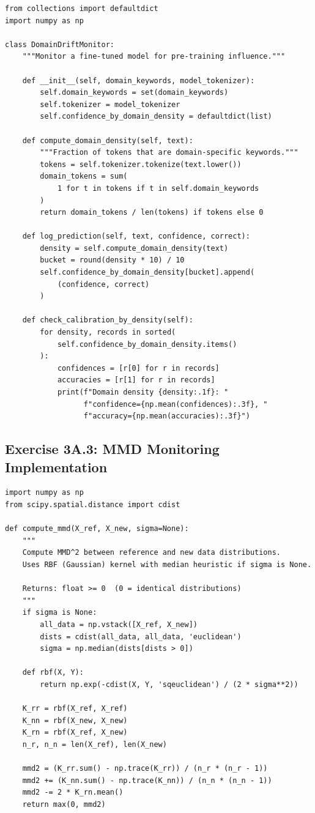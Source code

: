 \begin{lstlisting}[style=python, caption={Domain density monitoring for fine-tuned models}]
from collections import defaultdict
import numpy as np

class DomainDriftMonitor:
    """Monitor a fine-tuned model for pre-training influence."""

    def __init__(self, domain_keywords, model_tokenizer):
        self.domain_keywords = set(domain_keywords)
        self.tokenizer = model_tokenizer
        self.confidence_by_domain_density = defaultdict(list)

    def compute_domain_density(self, text):
        """Fraction of tokens that are domain-specific keywords."""
        tokens = self.tokenizer.tokenize(text.lower())
        domain_tokens = sum(
            1 for t in tokens if t in self.domain_keywords
        )
        return domain_tokens / len(tokens) if tokens else 0

    def log_prediction(self, text, confidence, correct):
        density = self.compute_domain_density(text)
        bucket = round(density * 10) / 10
        self.confidence_by_domain_density[bucket].append(
            (confidence, correct)
        )

    def check_calibration_by_density(self):
        for density, records in sorted(
            self.confidence_by_domain_density.items()
        ):
            confidences = [r[0] for r in records]
            accuracies = [r[1] for r in records]
            print(f"Domain density {density:.1f}: "
                  f"confidence={np.mean(confidences):.3f}, "
                  f"accuracy={np.mean(accuracies):.3f}")
\end{lstlisting}

\subsection{Exercise 3A.3: MMD Monitoring Implementation}

\begin{lstlisting}[style=python, caption={Maximum Mean Discrepancy drift monitor}]
import numpy as np
from scipy.spatial.distance import cdist

def compute_mmd(X_ref, X_new, sigma=None):
    """
    Compute MMD^2 between reference and new data distributions.
    Uses RBF (Gaussian) kernel with median heuristic if sigma is None.

    Returns: float >= 0  (0 = identical distributions)
    """
    if sigma is None:
        all_data = np.vstack([X_ref, X_new])
        dists = cdist(all_data, all_data, 'euclidean')
        sigma = np.median(dists[dists > 0])

    def rbf(X, Y):
        return np.exp(-cdist(X, Y, 'sqeuclidean') / (2 * sigma**2))

    K_rr = rbf(X_ref, X_ref)
    K_nn = rbf(X_new, X_new)
    K_rn = rbf(X_ref, X_new)
    n_r, n_n = len(X_ref), len(X_new)

    mmd2 = (K_rr.sum() - np.trace(K_rr)) / (n_r * (n_r - 1))
    mmd2 += (K_nn.sum() - np.trace(K_nn)) / (n_n * (n_n - 1))
    mmd2 -= 2 * K_rn.mean()
    return max(0, mmd2)
\end{lstlisting}

